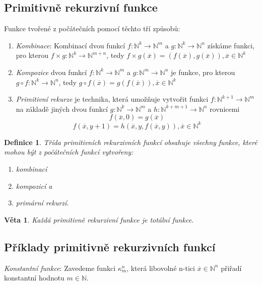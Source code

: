 \documentclass[a4paper, 11pt]{report}
\newtheorem{mydef}{Definice}[chapter]
\newtheorem{veta}{Věta}[chapter]
\begin{document}
\subsection{Primitivně rekurzivní funkce}
Funkce tvořené z počátečních pomocí těchto tří způsobů:
\begin{enumerate}
	\item \emph{Kombinace}: Kombinací dvou funkcí $f: \mathbb{N}^k \to \mathbb{N}^m$ a $g: \mathbb{N}^k \to \mathbb{N}^n$ získáme funkci, pro kterou
	$f \times g: \mathbb{N}^k \to \mathbb{N}^{m+n}$, tedy $f \times g(\overline{x}) = (f(\overline{x}), g(\overline{x})), \overline{x} \in \mathbb{N}^k$
	\item \emph{Kompozice} dvou funkcí $f: \mathbb{N}^k \to \mathbb{N}^m$ a $g: \mathbb{N}^m \to \mathbb{N}^n$ je funkce, pro kterou
	$g \circ f : \mathbb{N}^k \to \mathbb{N}^n$, tedy $g \circ f(\overline{x}) = g(f(\overline{x})), \overline{x} \in \mathbb{N}^k$
	\item \emph{Primitivní rekurze} je technika, která umožňuje vytvořit funkci $f: \mathbb{N}^{k+1} \to \mathbb{N}^m$ na základě jiných dvou funkcí $g: \mathbb{N}^k \to \mathbb{N}^m$ a $h: \mathbb{N}^{k+m+1} \to \mathbb{N}^n$ rovnicemi
	$$f(\overline{x}, 0) = g(\overline{x})$$
	$$f(\overline{x}, y+1) = h(\overline{x}, y, f(\overline{x}, y)), \overline{x} \in \mathbb{N}^k$$
\end{enumerate}

\begin{mydef}
Třída primitivních rekurzivních funkcí obsahuje všechny funkce, které mohou být z počátečních funkcí vytvořeny:
\begin{enumerate}
	\item kombinací
	\item kompozicí a 
	\item primární rekurzí.
\end{enumerate}
\end{mydef}

\begin{veta}
Každá primitivně rekurzivní funkce je totální funkce.
\end{veta}

\subsection{Příklady primitivně rekurzivních funkcí}

\emph{Konstantní funkce}: Zavedeme funkci $\kappa_m^n$, která libovolné n-tici $\overline{x} \in \mathbb{N}^n$ přiřadí konstantní hodnotu $m \in \mathbb{N}$.
\end{document}
